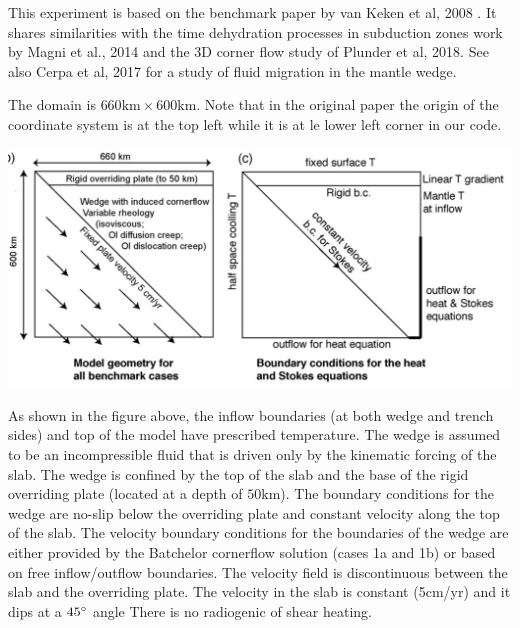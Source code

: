 
This experiment is based on the benchmark paper by van Keken et al, 2008 \cite{vack08}.
It shares similarities with the 
time dehydration processes in subduction zones work by Magni et al., 2014 \cite{mabv14} and 
the 3D corner flow study of Plunder et al, 2018\cite{pltv18}. See also Cerpa et al, 2017 \cite{ceww17}
for a study of fluid migration in the mantle wedge.

The domain is $660\text{km}\times 600\text{km}$. Note that in the original paper the 
origin of the coordinate system is at the top left while it is at le lower left corner 
in our code.

\begin{center}
\includegraphics[width=14cm]{python_codes/fieldstone_45/images/setup1}
\end{center}

As shown in the figure above, 
the inflow boundaries (at both wedge and trench sides) and top of the model 
have prescribed temperature. The wedge is assumed to be an incompressible fluid that
is driven only by the kinematic forcing of the slab. The wedge is
confined by the top of the slab and the base of the rigid overriding
plate (located at a depth of $50\text{km}$). 
The boundary conditions for the wedge are no-slip below the overriding plate and constant velocity
along the top of the slab. The velocity boundary conditions for the
boundaries of the wedge are either provided by the Batchelor cornerflow 
solution (cases 1a and 1b) or based on free inflow/outflow
boundaries. The velocity field is discontinuous between the slab
and the overriding plate.
The velocity in the slab is constant (5cm/yr) and it dips at a $45\degree$ angle
There is no radiogenic of shear heating.


